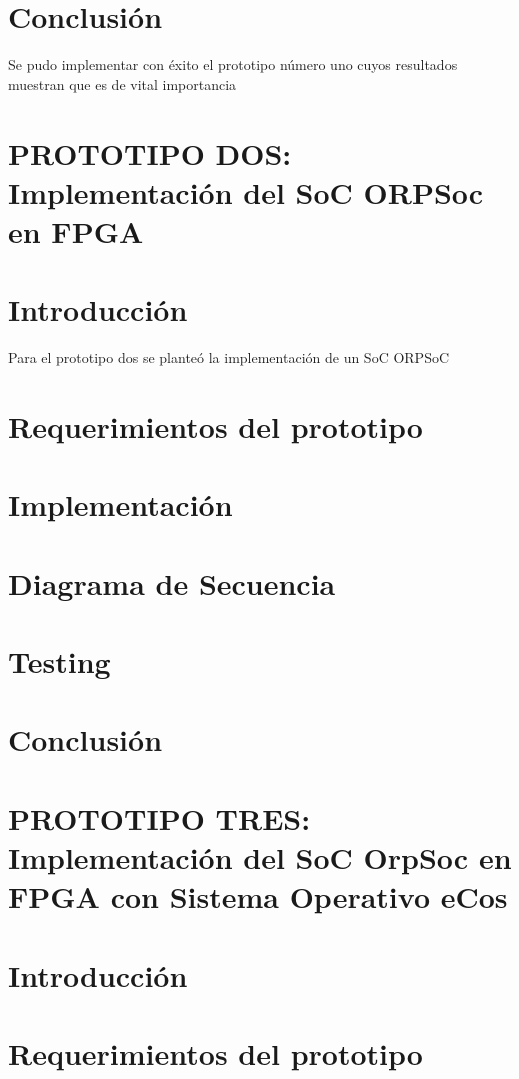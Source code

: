 		\section{Conclusión}
		Se pudo implementar con éxito el prototipo número uno cuyos resultados muestran que es de vital importancia 
			
	\section{PROTOTIPO DOS: Implementación del SoC ORPSoc en FPGA}
		\section{Introducción}
		Para el prototipo dos se planteó la implementación de un SoC ORPSoC 
		
		\section{Requerimientos del prototipo}

		\section{Implementación}

		\section{Diagrama de Secuencia}

		\section{Testing}

		\section{Conclusión}

	\section{PROTOTIPO TRES: Implementación del SoC OrpSoc en FPGA con Sistema Operativo eCos}
		\section{Introducción}
		\section{Requerimientos del prototipo}
